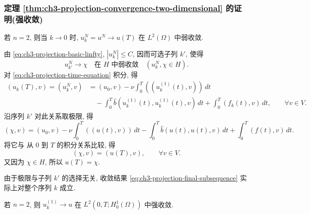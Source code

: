 \subsubsection{定理 \ref{thm:ch3-projection-convergence-two-dimensional} 的证明(强收敛)}
\label{subsubsec:ch3-projection-strong-h1-proof}

\begin{Lemma}
\label{lem:ch3-projection-final-time-weak}
若 $n=2$, 则当 $k\to0$ 时, $u_k^N=u^N\to u(T)$ 在 $L^2(\Omega)$ 中弱收敛.
\end{Lemma}

\begin{Proof}
由 \eqref{eq:ch3-projection-basic-linfty}, $|u_k^N|\leq C$, 因而可选子列 $k'$, 使得
\begin{equation}
u_{k'}^N\longrightarrow\chi
\quad\text{在 }H\text{ 中弱收敛}\quad(u_k^N,\chi\in H).
\label{eq:ch3-projection-final-subsequence}
\end{equation}
对 \eqref{eq:ch3-projection-time-equation} 积分, 得
\begin{align*}
(u_k(T),v)=(u_k^N,v)
&=(u_0,v)-\nu\int_0^T((u_k^{(1)}(t),v))\,dt\\
&\quad-\int_0^T\widehat b(u_k^{(1)}(t),u_k^{(1)}(t),v)\,dt
+\int_0^T(f_k(t),v)\,dt,\qquad\forall v\in V.
\end{align*}
沿序列 $k'$ 对此关系取极限, 得
\[
(\chi,v)=(u_0,v)-\nu\int_0^T((u(t),v))\,dt
-\int_0^T\widehat b(u(t),u(t),v)\,dt
+\int_0^T(f(t),v)\,dt.
\]
将它与  从 $0$ 到 $T$ 的积分关系比较, 得
\[
(\chi,v)=(u(T),v),\qquad\forall v\in V.
\]
又因为 $\chi\in H$, 所以 $u(T)=\chi$.

由于极限与子列 $k'$ 的选择无关, 收敛结果 \eqref{eq:ch3-projection-final-subsequence} 实际上对整个序列 $k$ 成立.
\end{Proof}

\begin{Lemma}
\label{lem:ch3-projection-h1-strong}
若 $n=2$, 则 $u_k^{(1)}\to u$ 在 $L^2(0,T;H_0^1(\Omega))$ 中强收敛.
\end{Lemma}

